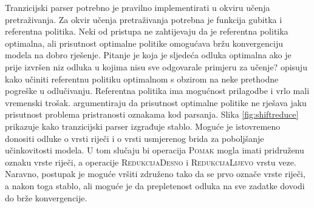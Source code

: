 Tranzicijski parser potrebno je pravilno implementirati u okviru učenja
pretraživanja. Za okvir učenja pretraživanja potrebna je funkcija gubitka i
referentna politika. Neki od pristupa ne zahtijevaju da je referentna politika
optimalna, ali prisutnost optimalne politike omogućava bržu konvergenciju modela
na dobro rješenje. Pitanje je koja je sljedeća odluka optimalna ako je prije
izvršen niz odluka u kojima nisu sve odgovarale primjeru za učenje?
\citet{goldberg2013training} opisuju kako učiniti referentnu politiku optimalnom s
obzirom na neke prethodne pogreške u odlučivanju. Referentna politika ima
mogućnost prilagodbe i vrlo mali vremenski trošak. \citet{andor2016globally}
argumentiraju da prisutnost optimalne politike ne rješava jaku prisutnost problema
pristranosti oznakama kod parsanja. Slika \ref{fig:shiftreduce} prikazuje kako
tranzicijski parser izgrađuje stablo. Moguće je istovremeno donositi odluke o
vrsti riječi i o vrsti usmjerenog brida za poboljšanje učinkovitosti modela. U
tom slučaju bi operacija \textsc{Pomak} mogla imati pridruženu oznaku vrste
riječi, a operacije \textsc{RedukcijaDesno} i \textsc{RedukcijaLijevo} vrstu
veze. Naravno, postupak je moguće vršiti združeno tako da se prvo označe vrste
riječi, a nakon toga stablo, ali moguće je da prepletenost odluka na sve zadatke
dovodi do brže konvergencije.

